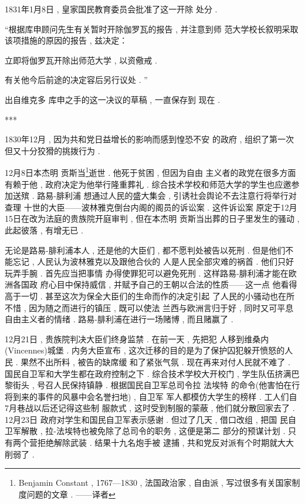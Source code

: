 1831年1月8日 , 皇家国民教育委员会批准了这一开除 处分 . 

“根据库申顾问先生有关暂时开除伽罗瓦的报告 , 并注意到师 范大学校长叙明采取该项措施的原因的报告 , 兹决定：

立即将伽罗瓦开除出师范大学 , 以资儆戒 . 

有关他今后前途的决定容后另行议处 . ”

出自维克多 \textbullet 库申之手的这一决议的草稿 , 一直保存到 现在 . 

\begin{center}***
\end{center}

1830年12月 , 因为共和党日益增长的影响而感到惶恐不安 的政府 , 组织了第一次但又十分狡猾的挑拨行为 . 

12月8日本杰明 \textbullet 贡斯当\footnote{Benjamin Constant , 1767—1830 , 法国政治家 , 自由派 , 写过很多有关国家制 度问题的文章 . ——译者}逝世 . 他死于贫困 , 但因为自由 主义者的政党在很多方面有赖于他 , 政府决定为他举行隆重葬礼 .  综合技术学校和师范大学的学生也应邀参加送殡 . 路易-腓利浦 想通过人民的盛大集会 , 引诱社会舆论不去注意行将举行对查理 十世的大臣——波林雅克倒台内阁的阁员的诉讼案 . 这件诉讼案 原定于12月15日在改为法庭的贵族院开庭审判 , 但在本杰明 \textbullet  贡斯当出葬的日子里发生的骚动 , 此起彼落 , 有增无已 . 

无论是路易-腓利浦本人 , 还是他的大臣们 , 都不愿判处被告以死刑 . 但是他们不能忘记 , 人民认为波林雅克以及跟他合伙的 人是人民全部灾难的祸首 . 他们只好玩弄手腕 . 首先应当把事情 办得使罪犯可以避免死刑 . 这样路易-腓利浦才能在欧洲各国政 府心目中保持威信 , 并赋予自己的王朝以合法的性质——这一点 他看得高于一切 . 甚至这次为保全大臣们的生命而作的决定引起 了人民的小骚动也在所不惜 , 因为随之而进行的镇压 , 既可以使法 兰西与欧洲言归于好 , 同时又可平息自由主义者的情绪 . 路易-腓利浦在进行一场赌博 , 而且赌赢了 . 

12月21日 , 贵族院判决大臣们终身监禁 . 在前一天 , 先把犯 人移到维桑内(Vincennes)城堡 . 内务大臣宣布 , 这次迁移的目的是为了保护囚犯躲开愤怒的人民 . 果然不出所料 , 被告的缺席缓 和了紧张气氛 . 现在再来对付人民就不难了 . 国民自卫军和大学生都在政府控制之下 . 综合技术学校大开校门 , 学生队伍挤满巴 黎街头 , 号召人民保持镇静 . 根据国民自卫军总司令拉 \textbullet 法埃特 的命令(他害怕在行将到来的事件的风暴中会名誉扫地) , 自卫军 军人都模仿大学生的榜样 . 工人们自7月巷战以后还记得这些制 服款式 , 这时受到制服的蒙蔽 , 他们就分散回家去了 . 12月23日 政府对学生和国民自卫军表示感谢 . 但过了几天 , 借口改组 , 把国 民自卫军解散 , 拉-法埃特也被免除了总司令的职务 , 这便是第二 部分的预谋计划 . 只有两个营拒绝解除武装 . 结果十九名炮手被 逮捕 , 共和党反对派有个时期就大大削弱了 . 

